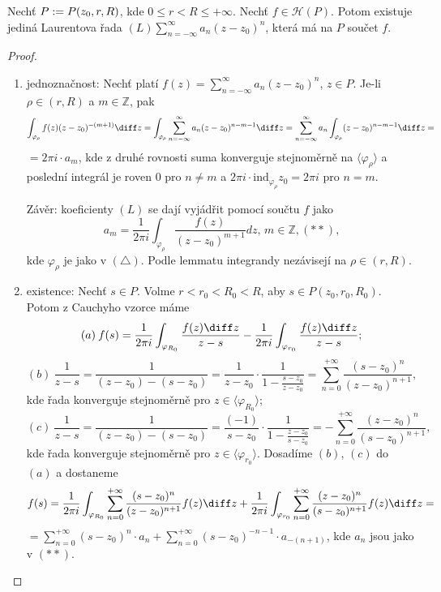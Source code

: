 \begin{theorem}
Nechť $P:= \\ P(z_0,r,R)$, kde $0\leq r < R \leq + \infty$. Nechť $f \in \mathcal{H}(P)$. Potom existuje jediná Laurentova řada $(L) \sum\limits_{n=-\infty}^{\infty} a_n(z-z_0)^n$, která má na $P$ součet $f$.
\end{theorem}

\begin{proof}

\begin{enumerate}
 \item jednoznačnost: Nechť platí $f(z)=\sum\limits_{n=-\infty}^\infty a_n(z-z_0)^n$, $z \in P$. Je-li $\rho \in (r, R)$ a $m \in \mathbb{Z}$, pak 
$$
\int_{\varphi_\rho}f(z)(z-z_0)^{-(m+1)} \diff z = \int_{\varphi_\rho} \sum\limits_{n=-\infty}^{\infty} a_n(z-z_0)^{n-m-1} \diff z = \sum\limits_{n=-\infty}^{\infty} a_n \int_{\varphi_\rho}(z-z_0)^{n-m-1} \diff z = 
$$
$=2\pi i \cdot a_m$, kde z druhé rovnosti suma konverguje stejnoměrně na $\langle\varphi_\rho \rangle$ a poslední integrál je roven $0$ pro $n \neq m$ a $2\pi i \cdot \text{ind}_{\varphi_\rho}z_0=2\pi i$ pro $n=m$.

Závěr: koeficienty $(L)$ se dají vyjádřit pomocí součtu $f$ jako 
$$
a_m=\frac{1}{2 \pi i}\int_{\varphi_\rho}\frac{f(z)}{(z-z_0)^{m+1}} dz\text{, } m \in \mathbb{Z}, (**)\text{,}
$$
kde $\varphi_\rho$ je jako v $(\triangle)$. Podle lemmatu integrandy nezávisejí na $\rho \in (r,R)$.
\item existence: Nechť $s \in P$. Volme $r<r_0<R_0<R$, aby $s \in P(z_0, r_0, R_0)$. Potom z Cauchyho vzorce máme 
$$
(a) \: f(s)=\frac{1}{2 \pi i}\int_{\varphi_{R_0}}\frac{f(z) \diff z}{z-s}-\frac{1}{2 \pi i}\int_{\varphi_{r_0}}\frac{f(z) \diff z}{z-s}\text{;}
$$
$$
(b) \: \frac{1}{z-s}=\frac{1}{(z-z_0)-(s-z_0)}=\frac{1}{z-z_0}\cdot \frac{1}{1-\frac{s-z_0}{z-z_0}}=\sum\limits_{n=0}^{+\infty}\frac{(s-z_0)^n}{(z-z_0)^{n+1}}\text{,}
$$
kde řada konverguje stejnoměrně pro $z \in \langle\varphi_{R_0} \rangle$;
$$
(c) \: \frac{1}{z-s}=\frac{1}{(z-z_0)-(s-z_0)}=\frac{(-1)}{s-z_0}\cdot \frac{1}{1-\frac{z-z_0}{s-z_0}}=-\sum\limits_{n=0}^{+\infty}\frac{(z-z_0)^n}{(s-z_0)^{n+1}}\text{,}
$$
kde řada konverguje stejnoměrně pro $z \in \langle\varphi_{r_0} \rangle$.
Dosadíme $(b)$, $(c)$ do $(a)$ a dostaneme
$$
f(s)=\frac{1}{2 \pi i}\int_{\varphi_{R_0}}\sum\limits_{n=0}^{+\infty}\frac{(s-z_0)^n}{(z-z_0)^{n+1}}f(z) \diff z+\frac{1}{2 \pi i}\int_{\varphi_{r_0}}\sum\limits_{n=0}^{+\infty}\frac{(z-z_0)^n}{(s-z_0)^{n+1}}f(z) \diff z =
$$
$=\sum\limits_{n=0}^{+\infty}(s-z_0)^n\cdot a_n+\sum\limits_{n=0}^{+\infty}(s-z_0)^{-n-1}\cdot a_{-(n+1)}$, kde $a_n$ jsou jako v $(**)$.
\end{enumerate}
\end{proof}

